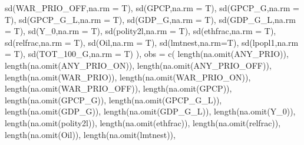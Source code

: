 \documentclass[
]{article}
\newenvironment{Shaded}{\begin{snugshade}}{\end{snugshade}}
\newcommand{\AttributeTok}[1]{\textcolor[rgb]{0.77,0.63,0.00}{#1}}
\newcommand{\FunctionTok}[1]{\textcolor[rgb]{0.00,0.00,0.00}{#1}}
\newcommand{\NormalTok}[1]{#1}
\begin{document}
\begin{Shaded}
\begin{Highlighting}[]
      \FunctionTok{sd}\NormalTok{(WAR\_PRIO\_OFF,}\AttributeTok{na.rm =}\NormalTok{ T),}
      \FunctionTok{sd}\NormalTok{(GPCP,}\AttributeTok{na.rm =}\NormalTok{ T),}
      \FunctionTok{sd}\NormalTok{(GPCP\_G,}\AttributeTok{na.rm =}\NormalTok{ T),}
      \FunctionTok{sd}\NormalTok{(GPCP\_G\_L,}\AttributeTok{na.rm =}\NormalTok{ T),}
      \FunctionTok{sd}\NormalTok{(GDP\_G,}\AttributeTok{na.rm =}\NormalTok{ T),}
      \FunctionTok{sd}\NormalTok{(GDP\_G\_L,}\AttributeTok{na.rm =}\NormalTok{ T),}
      \FunctionTok{sd}\NormalTok{(Y\_0,}\AttributeTok{na.rm =}\NormalTok{ T),}
      \FunctionTok{sd}\NormalTok{(polity2l,}\AttributeTok{na.rm =}\NormalTok{ T),}
      \FunctionTok{sd}\NormalTok{(ethfrac,}\AttributeTok{na.rm =}\NormalTok{ T),}
      \FunctionTok{sd}\NormalTok{(relfrac,}\AttributeTok{na.rm =}\NormalTok{ T),}
      \FunctionTok{sd}\NormalTok{(Oil,}\AttributeTok{na.rm =}\NormalTok{ T),}
      \FunctionTok{sd}\NormalTok{(lmtnest,}\AttributeTok{na.rm=}\NormalTok{T),}
      \FunctionTok{sd}\NormalTok{(lpopl1,}\AttributeTok{na.rm =}\NormalTok{ T),}
      \FunctionTok{sd}\NormalTok{(TOT\_100\_G,}\AttributeTok{na.rm =}\NormalTok{ T)}
\NormalTok{    ),}
    \AttributeTok{obs =} \FunctionTok{c}\NormalTok{(}
      \FunctionTok{length}\NormalTok{(}\FunctionTok{na.omit}\NormalTok{(ANY\_PRIO)),}
      \FunctionTok{length}\NormalTok{(}\FunctionTok{na.omit}\NormalTok{(ANY\_PRIO\_ON)),}
      \FunctionTok{length}\NormalTok{(}\FunctionTok{na.omit}\NormalTok{(ANY\_PRIO\_OFF)),}
      \FunctionTok{length}\NormalTok{(}\FunctionTok{na.omit}\NormalTok{(WAR\_PRIO)),}
      \FunctionTok{length}\NormalTok{(}\FunctionTok{na.omit}\NormalTok{(WAR\_PRIO\_ON)),}
      \FunctionTok{length}\NormalTok{(}\FunctionTok{na.omit}\NormalTok{(WAR\_PRIO\_OFF)),}
      \FunctionTok{length}\NormalTok{(}\FunctionTok{na.omit}\NormalTok{(GPCP)),}
      \FunctionTok{length}\NormalTok{(}\FunctionTok{na.omit}\NormalTok{(GPCP\_G)),}
      \FunctionTok{length}\NormalTok{(}\FunctionTok{na.omit}\NormalTok{(GPCP\_G\_L)),}
      \FunctionTok{length}\NormalTok{(}\FunctionTok{na.omit}\NormalTok{(GDP\_G)),}
      \FunctionTok{length}\NormalTok{(}\FunctionTok{na.omit}\NormalTok{(GDP\_G\_L)),}
      \FunctionTok{length}\NormalTok{(}\FunctionTok{na.omit}\NormalTok{(Y\_0)),}
      \FunctionTok{length}\NormalTok{(}\FunctionTok{na.omit}\NormalTok{(polity2l)),}
      \FunctionTok{length}\NormalTok{(}\FunctionTok{na.omit}\NormalTok{(ethfrac)),}
      \FunctionTok{length}\NormalTok{(}\FunctionTok{na.omit}\NormalTok{(relfrac)),}
      \FunctionTok{length}\NormalTok{(}\FunctionTok{na.omit}\NormalTok{(Oil)),}
      \FunctionTok{length}\NormalTok{(}\FunctionTok{na.omit}\NormalTok{(lmtnest)),}

\end{Highlighting}
\end{Shaded}
\end{document}

